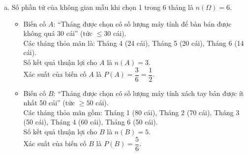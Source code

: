\begin{bt}
{\begin{enumerate}[a)]
\begin{itemize}
        \item Tháng 6: $|50 - 14| = 36$ cái.
    \end{itemize}
    Vậy Tháng 3 có sự chênh lệch ít nhất giữa số lượng máy tính xách tay và máy tính để bàn bán ra (chênh lệch 15 cái).
    \item Số phần tử của không gian mẫu khi chọn 1 trong 6 tháng là $n(\Omega) = 6$.
    \begin{itemize}
        \item Biến cố $A$: “Tháng được chọn có số lượng máy tính để bàn bán được không quá 30 cái” (tức $\le 30$ cái).\\
        Các tháng thỏa mãn là: Tháng 4 (24 cái), Tháng 5 (20 cái), Tháng 6 (14 cái).\\
        Số kết quả thuận lợi cho $A$ là $n(A) = 3$.\\
        Xác suất của biến cố $A$ là $P(A) = \dfrac{3}{6} = \dfrac{1}{2}$.
        \item Biến cố $B$: “Tháng được chọn có số lượng máy tính xách tay bán được ít nhất 50 cái” (tức $\ge 50$ cái).\\
        Các tháng thỏa mãn gồm: Tháng 1 (80 cái), Tháng 2 (70 cái), Tháng 3 (50 cái), Tháng 4 (60 cái), Tháng 6 (50 cái).\\
        Số kết quả thuận lợi cho $B$ là $n(B) = 5$.\\
        Xác suất của biến cố $B$ là $P(B) = \dfrac{5}{6}$.
    \end{itemize}
\end{enumerate}
}
\end{bt}

